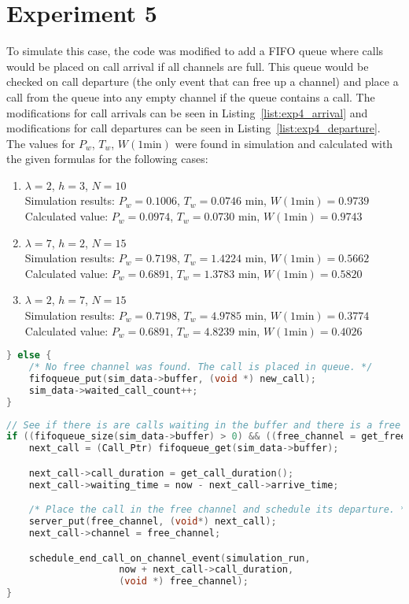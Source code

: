 \section*{Experiment 5}
To simulate this case, the code was modified to add a FIFO queue where calls would be placed on call arrival if all channels are full. This queue would be checked on call departure (the only event that can free up a channel) and place a call from the queue into any empty channel if the queue contains a call. The modifications for call arrivals can be seen in Listing~\ref{list:exp4_arrival} and modifications for call departures can be seen in Listing~\ref{list:exp4_departure}. The values for $P_w$, $T_w$, $W(1 \text{min})$ were found in simulation and calculated with the given formulas for the following cases:
\begin{enumerate}
\item
$\lambda = 2$, $h = 3$, $N = 10$\\
Simulation results: $P_w = 0.1006$, $T_w = 0.0746$ min, $W(1 \text{min}) = 0.9739$\\
Calculated value: $P_w = 0.0974$, $T_w = 0.0730$ min, $W(1 \text{min}) = 0.9743$

\item
$\lambda = 7$, $h = 2$, $N = 15$\\
Simulation results: $P_w = 0.7198$, $T_w = 1.4224$ min, $W(1 \text{min}) = 0.5662$\\
Calculated value: $P_w = 0.6891$, $T_w = 1.3783$ min, $W(1 \text{min}) = 0.5820$

\item 
$\lambda = 2$, $h = 7$, $N = 15$\\
Simulation results: $P_w = 0.7198$, $T_w = 4.9785$ min, $W(1 \text{min}) = 0.3774$\\
Calculated value: $P_w = 0.6891$, $T_w = 4.8239$ min, $W(1 \text{min}) = 0.4026$
\end{enumerate}

\begin{lstlisting}[language=c,caption=Wait on Call Arrival, label=list:exp4_arrival]
} else {
	/* No free channel was found. The call is placed in queue. */
	fifoqueue_put(sim_data->buffer, (void *) new_call);
	sim_data->waited_call_count++;
}
\end{lstlisting}

\begin{lstlisting}[language=c,caption=Wait on Call Departure, label=list:exp4_departure]
// See if there is are calls waiting in the buffer and there is a free channel. If so, take the next one out and connect it immediately.
if ((fifoqueue_size(sim_data->buffer) > 0) && ((free_channel = get_free_channel(simulation_run)) != NULL)) {
	next_call = (Call_Ptr) fifoqueue_get(sim_data->buffer);

	next_call->call_duration = get_call_duration();
	next_call->waiting_time = now - next_call->arrive_time;

	/* Place the call in the free channel and schedule its departure. */
	server_put(free_channel, (void*) next_call);
	next_call->channel = free_channel;

	schedule_end_call_on_channel_event(simulation_run,
					now + next_call->call_duration,
					(void *) free_channel);
}
\end{lstlisting}
